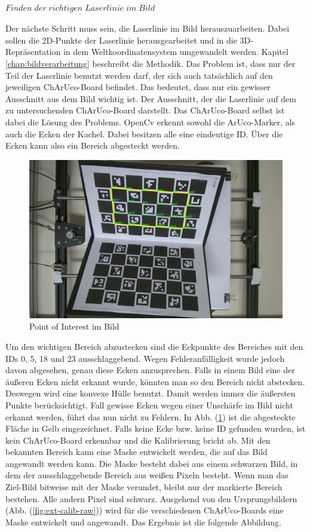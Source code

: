 		$\underline{Finden \; der \; richtigen \; Laserlinie \; im \; Bild}$
		
		Der nächste Schritt muss sein, die Laserlinie im Bild herauszuarbeiten. Dabei sollen die 2D-Punkte der Laserlinie herausgearbeitet und in die 3D-Repräsentation in dem Weltkoordinatensystem umgewandelt werden. Kapitel \ref{chap:bildverarbeitung} beschreibt die Methodik. Das Problem ist, dass nur der Teil der Laserlinie benutzt werden darf, der sich auch tatsächlich auf den jeweiligen ChArUco-Board befindet. Das bedeutet, dass nur ein gewisser Ausschnitt aus dem Bild wichtig ist. Der Ausschnitt, der die Laserlinie auf dem zu untersuchenden ChArUco-Board darstellt. \newline
		Das ChArUco-Board selbst ist dabei die Lösung des Problems. OpenCv erkennt sowohl die ArUco-Marker, als auch die Ecken der Kachel. Dabei besitzen alle eine eindeutige ID. Über die Ecken kann also ein Bereich abgesteckt werden.
		
		\begin{figure}[h]
			\centering
			\includegraphics[width=0.8\linewidth]{img/hauptteil/ext-calib/charuco_convex_hull_primary.png}
			\caption{Point of Interest im Bild}
			\label{fig:ext-calib-hull}
		\end{figure}
	
		Um den wichtigen Bereich abzustecken sind die Eckpunkte des Bereiches mit den IDs 0, 5, 18 und 23 ausschlaggebend. Wegen Fehleranfälligkeit wurde jedoch davon abgesehen, genau diese Ecken anzusprechen. Falls in einem Bild eine der äußeren Ecken nicht erkannt wurde, könnten man so den Bereich nicht abstecken. Deswegen wird eine konvexe Hülle benutzt. Damit werden immer die äußersten Punkte berücksichtigt. Fall gewisse Ecken wegen einer Unschärfe im Bild nicht erkannt werden, führt das nun nicht zu Fehlern. In Abb. (\ref{fig:ext-calib-hull}) ist die abgesteckte Fläche in Gelb eingezeichnet. Falls keine Ecke bzw. keine ID gefunden wurden, ist kein ChArUco-Board erkennbar und die Kalibrierung bricht ab. \newline
		Mit den bekannten Bereich kann eine Maske entwickelt werden, die auf das Bild angewandt werden kann. Die Maske besteht dabei aus einem schwarzen Bild, in dem der ausschlaggebende Bereich aus weißen Pixeln besteht. Wenn man das Ziel-Bild bitweise mit der Maske verundet, bleibt nur der markierte Bereich bestehen. Alle andern Pixel sind schwarz. Ausgehend von den Ursprungsbildern (Abb. (\ref{fig:ext-calib-raw})) wird für die verschiedenen ChArUco-Boards eine Maske entwickelt und angewandt. Das Ergebnis ist die folgende Abbildung.
		
